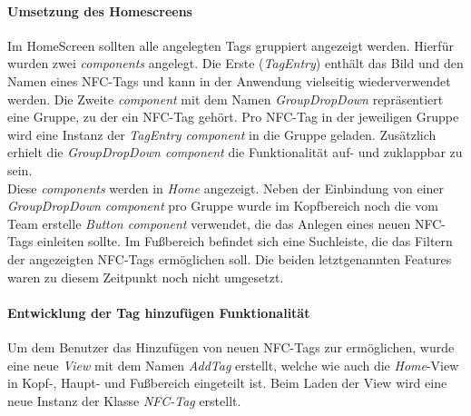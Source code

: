 \documentclass[10pt, a4paper]{article}
\begin{document}
\paragraph*{Umsetzung des Homescreens}
Im HomeScreen sollten alle angelegten Tags gruppiert angezeigt werden. Hierfür wurden zwei \textit{components} angelegt. Die Erste (\textit{TagEntry})
enthält das Bild und den Namen eines NFC-Tags und kann in der Anwendung vielseitig wiederverwendet werden. Die Zweite \textit{component} mit dem Namen
\textit{GroupDropDown} repräsentiert eine Gruppe, zu der ein NFC-Tag gehört.
Pro NFC-Tag in der jeweiligen Gruppe wird eine Instanz der \textit{TagEntry component} in die Gruppe geladen.
Zusätzlich erhielt die \textit{GroupDropDown component} die Funktionalität auf- und
zuklappbar zu sein. \\
Diese \textit{components} werden in \textit{Home} angezeigt. Neben der Einbindung von einer \textit{GroupDropDown component} pro Gruppe
wurde im Kopfbereich noch die vom Team erstelle \textit{Button component} verwendet, die das Anlegen eines neuen NFC-Tags einleiten sollte.
Im Fußbereich befindet sich eine Suchleiste, die das Filtern der angezeigten NFC-Tags ermöglichen soll.
Die beiden letztgenannten Features waren zu diesem Zeitpunkt noch nicht umgesetzt.

\paragraph*{Entwicklung der \glqq Tag hinzufügen\grqq{} Funktionalität}
Um dem Benutzer das Hinzufügen von neuen NFC-Tags zur ermöglichen, wurde eine neue \textit{View} mit dem Namen \textit{AddTag} erstellt, welche wie auch
die \textit{Home}-View in Kopf-, Haupt- und Fußbereich eingeteilt ist. Beim Laden der View wird eine neue Instanz der Klasse \textit{NFC-Tag} erstellt.
\\~\\
\end{document}
